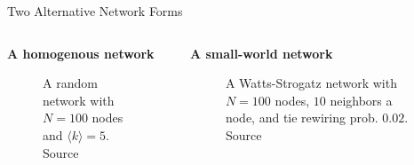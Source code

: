 \documentclass[notes, aspectratio=1610]{beamer}
\begin{document}
\begin{frame}{Two Alternative Network Forms}
	\begin{columns}[t]
		\begin{column}{0.5\textwidth}
			\begin{center}
				\textbf{A homogenous network}
				\begin{figure}
					
				\caption*{
					\footnotesize
					A random network with $N=100$ nodes 
					and $\langle k \rangle = 5$. Source 
					\cite{steger1999}
					}
				\end{figure}
			\end{center}
		\end{column}
		\begin{column}{0.5\textwidth}
			\begin{center}
				\textbf{A small-world network}
				\begin{figure}
					
				\caption*{
					\footnotesize
					A Watts-Strogatz network with $N=100$
					nodes, $10$ neighbors a node, and 
					tie rewiring prob. $0.02$. Source
					\cite{watts1998}
					}
				\end{figure}
			\end{center}
		\end{column}
	\end{columns}
\end{frame}
\end{document}
